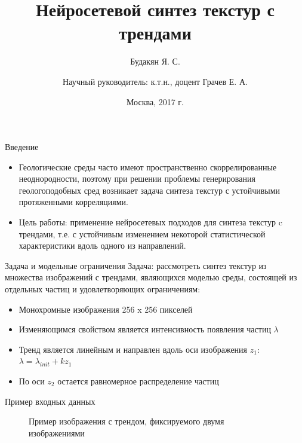 \documentclass[12pt]{beamer}
\begin{document}
	\title{Нейросетевой синтез текстур с трендами}
	\author{Будакян Я. С. \and \break \break Научный руководитель: к.т.н., доцент Грачев Е. А.}
	\date{Москва, 2017 г.} 

	\maketitle

	\begin{frame}{Введение}
		\begin{itemize}
			\item Геологические среды часто имеют пространственно скоррелированные неоднородности, поэтому при решении проблемы генерирования геологоподобных сред возникает задача синтеза текстур с устойчивыми протяженными корреляциями.
		
			\item Цель работы: применение нейросетевых подходов для синтеза текстур c трендами, т.е. с устойчивым изменением некоторой статистической характеристики вдоль одного из направлений.
		\end{itemize}
	\end{frame}
	
	\begin{frame}{Задача и модельные ограничения}
		Задача: рассмотреть синтез текстур из множества изображений с трендами, являющихся моделью среды, состоящей из отдельных частиц и удовлетворяющих ограничениям:
		
		\begin{itemize}
			\item Монохромные изображения 256 x 256 пикселей
			\item Изменяющимся свойством является интенсивность появления частиц $\lambda$
			\item Тренд является линейным и направлен вдоль оси изображения $z_1$: 
			$ \lambda = \lambda_{init} + k z_1 $
			\item По оси $z_2$ остается равномерное распределение частиц
		\end{itemize}
	\end{frame}
	
	\begin{frame}{Пример входных данных}
		\begin{figure}[h]
			\vfill
			Пример изображения с трендом, фиксируемого двумя изображениями
		\end{figure}
	\end{frame}
	
\end{document}
